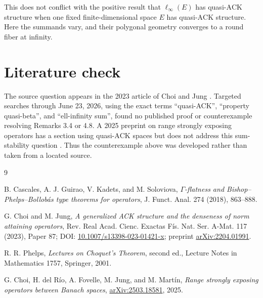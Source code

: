 \documentclass[11pt]{article}
\theoremstyle{definition}
\newcommand{\ACK}{\mathrm{ACK}}
\begin{document}
This does not conflict with the positive result that $\ell_\infty(E)$ has
quasi-$\ACK$ structure when one fixed finite-dimensional space $E$ has
quasi-$\ACK$ structure.  Here the summands vary, and their polygonal geometry
converges to a round fiber at infinity.

\section{Literature check}

The source question appears in the 2023 article of Choi and Jung
\cite{ChoiJung}.  Targeted searches through June 23, 2026, using the exact
terms ``quasi-ACK'', ``property quasi-beta'', and ``ell-infinity sum'', found
no published proof or counterexample resolving Remarks 3.4 or 4.8.  A 2025
preprint on range strongly exposing operators has a section using
quasi-$\ACK$ spaces but does not address this sum-stability question
\cite{RSE}.  Thus the counterexample above was developed rather than taken
from a located source.

\begin{thebibliography}{9}

B. Cascales, A. J. Guirao, V. Kadets, and M. Soloviova,
\emph{$\Gamma$-flatness and Bishop--Phelps--Bollob\'as type theorems for
operators}, J. Funct. Anal. 274 (2018), 863--888.

G. Choi and M. Jung,
\emph{A generalized ACK structure and the denseness of norm attaining
operators}, Rev. Real Acad. Cienc. Exactas F\'is. Nat. Ser. A-Mat. 117
(2023), Paper 87; DOI: \href{https://doi.org/10.1007/s13398-023-01421-x}
{10.1007/s13398-023-01421-x}; preprint
\href{https://arxiv.org/abs/2204.01991}{arXiv:2204.01991}.

R. R. Phelps,
\emph{Lectures on Choquet's Theorem}, second ed., Lecture Notes in
Mathematics 1757, Springer, 2001.

G. Choi, H. del R\'io, A. Fovelle, M. Jung, and M. Mart\'in,
\emph{Range strongly exposing operators between Banach spaces},
\href{https://arxiv.org/abs/2503.18581}{arXiv:2503.18581}, 2025.

\end{thebibliography}
\end{document}
